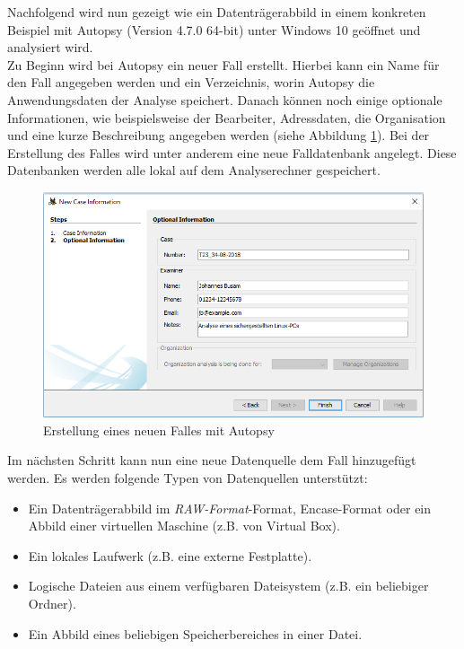 \noindent
Nachfolgend wird nun gezeigt wie ein Datenträgerabbild in einem konkreten Beispiel mit Autopsy (Version 4.7.0 64-bit) unter Windows 10 geöffnet und analysiert wird.\\
Zu Beginn wird bei Autopsy ein neuer Fall erstellt. Hierbei kann ein Name für den Fall angegeben werden und ein Verzeichnis, worin Autopsy die Anwendungsdaten der Analyse speichert. Danach können noch einige optionale Informationen, wie beispielsweise der Bearbeiter, Adressdaten, die Organisation und eine kurze Beschreibung angegeben werden (siehe Abbildung \ref{fig:autopsy_1_case_information}). Bei der Erstellung des Falles wird unter anderem eine neue Falldatenbank angelegt. Diese Datenbanken werden alle lokal auf dem Analyserechner gespeichert.\\

\begin{figure}[ht]
  \centering
  \includegraphics[width=\textwidth]{./resource/autopsy_1_case_information.png}
  \caption{Erstellung eines neuen Falles mit Autopsy}
  \label{fig:autopsy_1_case_information}
\end{figure}

\noindent
Im nächsten Schritt kann nun eine neue Datenquelle dem Fall hinzugefügt werden. Es werden folgende Typen von Datenquellen unterstützt:
\begin{itemize}
\item Ein Datenträgerabbild im \textit{RAW-Format}-Format, Encase-Format oder ein Abbild einer virtuellen Maschine (z.B. von Virtual Box).
\item Ein lokales Laufwerk (z.B. eine externe Festplatte).
\item Logische Dateien aus einem verfügbaren Dateisystem (z.B. ein beliebiger Ordner).
\item Ein Abbild eines beliebigen Speicherbereiches in einer Datei.
\end{itemize}

